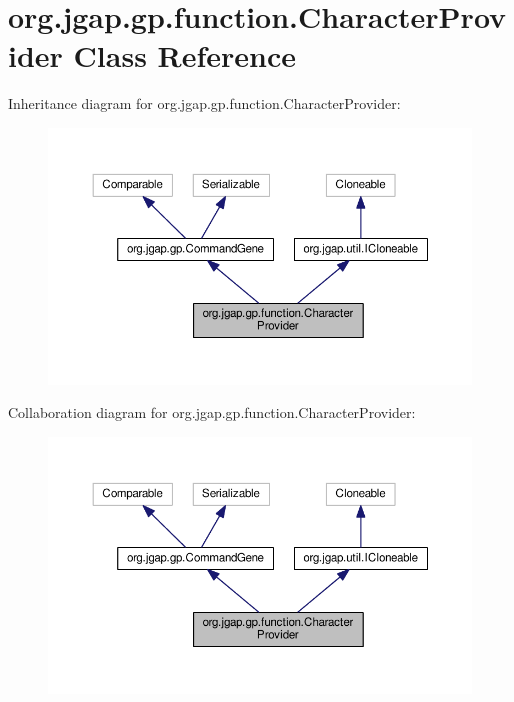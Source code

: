 \hypertarget{classorg_1_1jgap_1_1gp_1_1function_1_1_character_provider}{\section{org.\-jgap.\-gp.\-function.\-Character\-Provider Class Reference}
\label{classorg_1_1jgap_1_1gp_1_1function_1_1_character_provider}
}


Inheritance diagram for org.\-jgap.\-gp.\-function.\-Character\-Provider\-:
\nopagebreak
\begin{figure}[H]
\begin{center}
\leavevmode
\includegraphics[width=350pt]{classorg_1_1jgap_1_1gp_1_1function_1_1_character_provider__inherit__graph}
\end{center}
\end{figure}


Collaboration diagram for org.\-jgap.\-gp.\-function.\-Character\-Provider\-:
\nopagebreak
\begin{figure}[H]
\begin{center}
\leavevmode
\includegraphics[width=350pt]{classorg_1_1jgap_1_1gp_1_1function_1_1_character_provider__coll__graph}
\end{center}
\end{figure}
